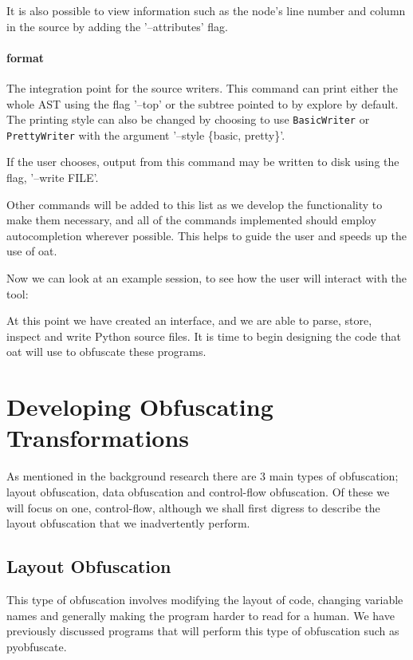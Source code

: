 \documentclass{report}
\begin{document}
It is also possible to view information such as the node's line number and column in the source by adding the '--attributes' flag.

\paragraph{format}

The integration point for the source writers. This command can print either the whole AST using the flag '--top' or the subtree pointed
to by explore by default. The printing style can also be changed by choosing to use \texttt{BasicWriter} or \texttt{PrettyWriter} with
the argument '--style \{basic, pretty\}'.

If the user chooses, output from this command may be written to disk using the flag, '--write FILE'.

Other commands will be added to this list as we develop the functionality to make them necessary, and all of the commands implemented
should employ autocompletion wherever possible. This helps to guide the user and speeds up the use of oat.

Now we can look at an example session, to see how the user will interact with the tool:



At this point we have created an interface, and we are able to parse, store, inspect and write Python source
files. It is time to begin designing the code that oat will use to obfuscate these programs.

\section{Developing Obfuscating Transformations}

As mentioned in the background research there are 3 main types of obfuscation; layout obfuscation, data
obfuscation and control-flow obfuscation. Of these we will focus on one, control-flow, although we shall
first digress to describe the layout obfuscation that we inadvertently perform.

\subsection{Layout Obfuscation}

This type of obfuscation involves modifying the layout of code, changing variable names and
generally making the program harder to read for a human. We have previously discussed programs that will
perform this type of obfuscation such as pyobfuscate.
\end{document}
